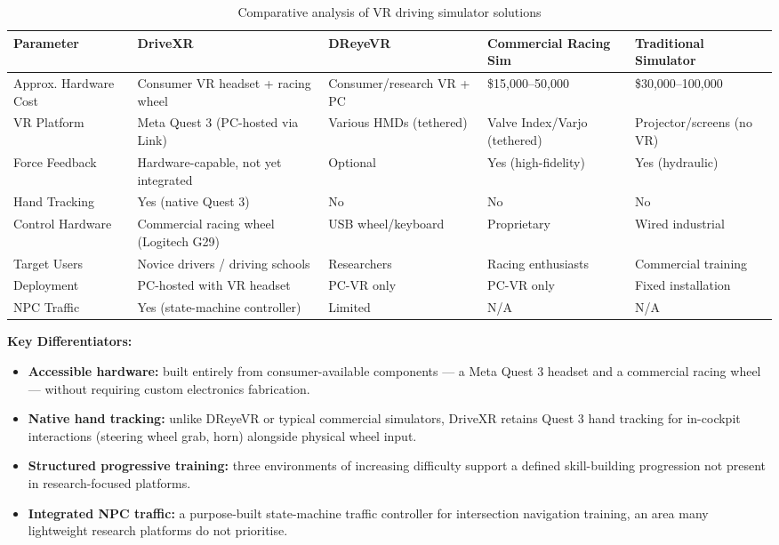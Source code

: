 \begin{table}[H]
\caption{Comparative analysis of VR driving simulator solutions}
\label{tab:comparative_analysis}
\centering
\small
\begin{tabular}{|p{3cm}|p{2.2cm}|p{2.2cm}|p{2.2cm}|p{2.2cm}|}
\hline
\textbf{Parameter} & \textbf{DriveXR} & \textbf{DReyeVR~\cite{Silvera2022}} & \textbf{Commercial Racing Sim} & \textbf{Traditional Simulator} \\ \hline
Approx. Hardware Cost & Consumer VR headset + racing wheel & Consumer/research VR + PC & \$15,000--50,000 & \$30,000--100,000 \\ \hline
VR Platform & Meta Quest 3 (PC-hosted via Link) & Various HMDs (tethered) & Valve Index/Varjo (tethered) & Projector/screens (no VR) \\ \hline
Force Feedback & Hardware-capable, not yet integrated & Optional & Yes (high-fidelity) & Yes (hydraulic) \\ \hline
Hand Tracking & Yes (native Quest 3) & No & No & No \\ \hline
Control Hardware & Commercial racing wheel (Logitech G29) & USB wheel/keyboard & Proprietary & Wired industrial \\ \hline
Target Users & Novice drivers / driving schools & Researchers & Racing enthusiasts & Commercial training \\ \hline
Deployment & PC-hosted with VR headset & PC-VR only & PC-VR only & Fixed installation \\ \hline
NPC Traffic & Yes (state-machine controller) & Limited & N/A & N/A \\ \hline
\end{tabular}
\end{table}

\textbf{Key Differentiators:}
\begin{itemize}
    \item \textbf{Accessible hardware:} built entirely from consumer-available components — a Meta Quest 3 headset and a commercial racing wheel — without requiring custom electronics fabrication.
    \item \textbf{Native hand tracking:} unlike DReyeVR or typical commercial simulators, DriveXR retains Quest 3 hand tracking for in-cockpit interactions (steering wheel grab, horn) alongside physical wheel input.
    \item \textbf{Structured progressive training:} three environments of increasing difficulty support a defined skill-building progression not present in research-focused platforms.
    \item \textbf{Integrated NPC traffic:} a purpose-built state-machine traffic controller for intersection navigation training, an area many lightweight research platforms do not prioritise.
\end{itemize}

